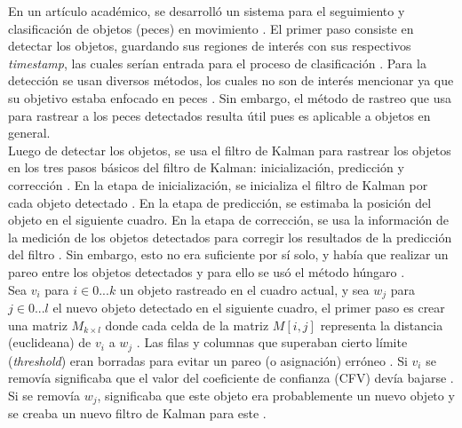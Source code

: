 \documentclass[a4paper,openright,12pt]{report}
\begin{document}
En un artículo académico, se desarrolló un sistema para el seguimiento y
clasificación de objetos (peces) en movimiento \cite{szHucs2015svm}. El primer
paso consiste en detectar los objetos, guardando sus regiones de interés con sus
respectivos \textit{timestamp}, las cuales serían entrada para el proceso de
clasificación \cite{szHucs2015svm}. Para la detección se usan diversos métodos,
los cuales no son de interés mencionar ya que su objetivo estaba enfocado en
peces \cite{szHucs2015svm}. Sin embargo, el método de rastreo que usa para
rastrear a los peces detectados resulta útil pues es aplicable a objetos en
general.\\

Luego de detectar los objetos, se usa el filtro de Kalman para rastrear los
objetos en los tres pasos básicos del filtro de Kalman: inicialización,
predicción y corrección \cite{szHucs2015svm}. En la etapa de inicialización,
se inicializa el filtro de Kalman por cada objeto detectado
\cite{szHucs2015svm}. En la etapa de predicción, se estimaba la posición del
objeto en el siguiente cuadro. En la etapa de corrección, se usa la información
de la medición de los objetos detectados para corregir los resultados de la
predicción del filtro \cite{szHucs2015svm}. Sin embargo, esto no era suficiente
por sí solo, y había que realizar un pareo entre los objetos detectados y para
ello se usó el método húngaro \cite{szHucs2015svm}.\\

Sea $v_{i}$ para $i \in 0...k$ un objeto rastreado en el cuadro actual, y sea
$w_{j}$ para $j \in 0...l$ el nuevo objeto detectado en el siguiente cuadro, el
primer paso es crear una matriz $M_{k \times l}$ donde cada celda de la matriz
$M[i,j]$ representa la distancia (euclideana) de $v_{i}$ a $w_{j}$
\cite{szHucs2015svm}. Las filas y columnas que superaban cierto límite
(\textit{threshold}) eran borradas para evitar un pareo (o asignación) erróneo
\cite{szHucs2015svm}. Si $v_{i}$ se removía significaba que el valor del
coeficiente de confianza (CFV) devía bajarse \cite{szHucs2015svm}. Si se removía
$w_{j}$, significaba que este objeto era probablemente un nuevo objeto y se
creaba un nuevo filtro de Kalman para este \cite{szHucs2015svm}.\\
\end{document}
